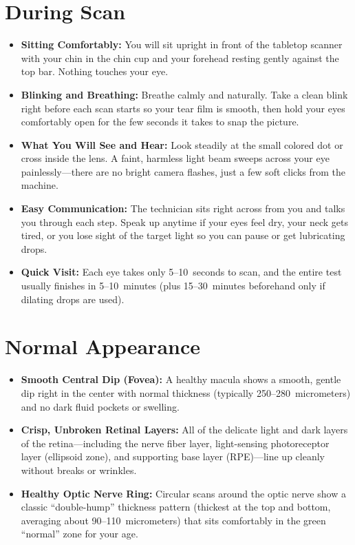 \section{During Scan}
\begin{itemize}
\item \textbf{Sitting Comfortably:} You will sit upright in front of the tabletop scanner with your chin in the chin cup and your forehead resting gently against the top bar. Nothing touches your eye.
\item \textbf{Blinking and Breathing:} Breathe calmly and naturally. Take a clean blink right before each scan starts so your tear film is smooth, then hold your eyes comfortably open for the few seconds it takes to snap the picture.
\item \textbf{What You Will See and Hear:} Look steadily at the small colored dot or cross inside the lens. A faint, harmless light beam sweeps across your eye painlessly---there are no bright camera flashes, just a few soft clicks from the machine.
\item \textbf{Easy Communication:} The technician sits right across from you and talks you through each step. Speak up anytime if your eyes feel dry, your neck gets tired, or you lose sight of the target light so you can pause or get lubricating drops.
\item \textbf{Quick Visit:} Each eye takes only 5--10~seconds to scan, and the entire test usually finishes in 5--10~minutes (plus 15--30~minutes beforehand only if dilating drops are used).
\end{itemize}

\section{Normal Appearance}
\begin{itemize}
\item \textbf{Smooth Central Dip (Fovea):} A healthy macula shows a smooth, gentle dip right in the center with normal thickness (typically 250--280~micrometers) and no dark fluid pockets or swelling.
\item \textbf{Crisp, Unbroken Retinal Layers:} All of the delicate light and dark layers of the retina---including the nerve fiber layer, light-sensing photoreceptor layer (ellipsoid zone), and supporting base layer (RPE)---line up cleanly without breaks or wrinkles.
\item \textbf{Healthy Optic Nerve Ring:} Circular scans around the optic nerve show a classic ``double-hump'' thickness pattern (thickest at the top and bottom, averaging about 90--110~micrometers) that sits comfortably in the green ``normal'' zone for your age.
\end{itemize}

